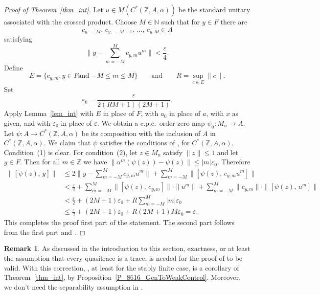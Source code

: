 \documentclass[11pt]{amsart}
\theoremstyle{plain}
\theoremstyle{definition}
\newtheorem{remark}[theorem]{Remark}
\theoremstyle{remark}
\numberwithin{equation}{section}
\newcommand{\af}{\alpha}
\newcommand{\ep}{\varepsilon}
\newcommand{\andeqn}{\qquad {\mbox{and}} \qquad}
\begin{document}
\begin{proof}[Proof of Theorem~\ref{thm_int}]
Let $u \in M ( C^{*} ({\mathbb{Z}}, A, \alpha) )$
be the standard unitary
associated with the crossed product.
Choose $M \in {\mathbb{N}}$
such that for $y \in F$ there are
\[
c_{y, \, -M}, \, c_{y, \, - M + 1}, \, \ldots, \, c_{y, M} \in A
\]
satisfying
\[
\Bigg\| y - \sum_{m = - M}^{M} c_{y, m} u^m \Bigg\| < \frac{\ep}{4}.
\]
Define
\[
E = \big\{ c_{y, m} \colon
         {\mbox{$y \in F$
           and $- M \leq m \leq M$}} \big\}
\andeqn
R = \sup_{c \in E} \| c \|.
\]
Set
\[
\ep_0 = \frac{\ep}{2 (R M + 1) (2 M + 1)}.
\]
Apply Lemma~\ref{lem_int} with $E$ in place of $F$,
with $a_{0}$ in place of $a$, with $x$ as given,
and with $\varepsilon_0$ in place of $\varepsilon$.
We obtain a c.p.c.~order zero map $\psi_0 \colon M_{n} \to A$.
Let $\psi \colon A \to C^{*} ({\mathbb{Z}}, A, \alpha)$
be its composition
with the inclusion of $A$ in $C^{*} ({\mathbb{Z}}, A, \alpha)$.
We claim that $\psi$ satisfies
the conditions of \cite[Definition~3.6]{AGJP21},
for $C^{*} ({\mathbb{Z}}, A, \alpha)$.
Condition~(1) is clear.
For condition~(2), let $z \in M_n$ satisfy $\| z \| \leq 1$ and let $y \in F$.
Then for all $m \in {\mathbb{Z}}$
we have
$\| \af^m (\psi (z)) - \psi (z) \| \leq | m | \ep_0$.
Therefore
%
\begin{align*}
\| [ \psi (z), \, y ] \|
& \leq 2 \Bigg\| y - \sum_{m = - M}^{M} c_{y, m} u^m \Bigg\|
  + \sum_{m = - M}^{M} \| [ \psi (z), \, c_{y, m} u^m ] \|
\\
& < \frac{\ep}{2}
      + \sum_{m = - M}^{M} \| [ \psi (z), \, c_{y, m} ] \| \cdot\| u^m \|
      + \sum_{m = - M}^{M} \| c_{y, m} \|\cdot \| [ \psi (z), \, u^m ] \|
\\
& < \frac{\ep}{2} + (2 M + 1) \ep_0
      + R \sum_{m = - M}^{M} | m | \ep_0
\\
& \leq \frac{\ep}{2} + (2 M + 1) \ep_0 + R (2 M + 1) M \ep_0
   = \ep.
\end{align*}
%
This completes the proof first part of the statement. The second part follows from
the first part and \cite[Theorem~A]{CLS2021}.
\end{proof}


\begin{remark}\label{rmk_cont}
As discussed in the introduction to this section,
exactness,
or at least the assumption that every quasitrace is a trace,
is needed for the proof of \cite[Theorem 6.7]{HO13}
to be valid.
With this correction,
\cite[Theorem 6.7]{HO13}, at least for the stably finite case,
is a corollary of Theorem~\ref{thm_int},
by Proposition~\ref{P_8616_GenToWeakControl}.
Moreover, we don't need the separability assumption
in \cite[Theorem 6.7]{HO13}.
\end{remark}
\end{document}

